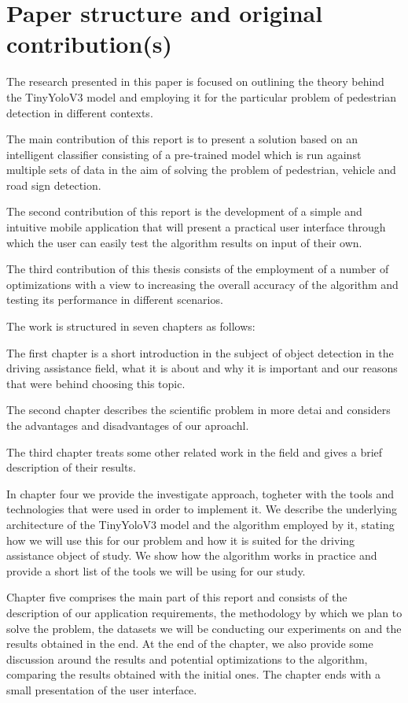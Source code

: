 \documentclass[runningheads,a4paper,11pt]{report}
\begin{document}
\section{Paper structure and original contribution(s)}
\label{section:structure}

The research presented in this paper is focused on outlining the theory behind the TinyYoloV3 model and employing it for the particular problem of pedestrian detection in different contexts.

The main contribution of this report is to present a solution based on an intelligent classifier consisting of a pre-trained model which is run against multiple sets of data in the aim of solving the problem of pedestrian, vehicle and road sign detection.

The second contribution of this report is the development of a simple and intuitive mobile application that will present a practical user interface through which the user can easily test the algorithm results on input of their own.

The third contribution of this thesis consists of the employment of a number of optimizations with a view to increasing the overall accuracy of the algorithm and testing its performance in different scenarios.

The work is structured in seven chapters as follows: 

The first chapter is a short introduction in the subject of object detection in the driving assistance field, what it is about and why it is important and our reasons that were behind choosing this topic. 

The second chapter describes the scientific problem in more detai and considers the advantages and disadvantages of our aproachl.

The third chapter treats some other related work in the field and gives a brief description of their results.

In chapter four we provide the investigate approach, togheter with the tools and technologies that were used in order to implement it. We describe the underlying architecture of the TinyYoloV3 model and the algorithm employed by it, stating how we will use this for our problem and how it is suited for the driving assistance object of study. We show how the algorithm works in practice and provide a short list of the tools we will be using for our study.

Chapter five comprises the main part of this report and consists of the description of our application requirements, the methodology by which we plan to solve the problem, the datasets we will be conducting our experiments on and the results obtained in the end. At the end of the chapter, we also provide some discussion around the results and potential optimizations to the algorithm, comparing the results obtained with the initial ones. The chapter ends with a small presentation of the user interface.
\end{document}
